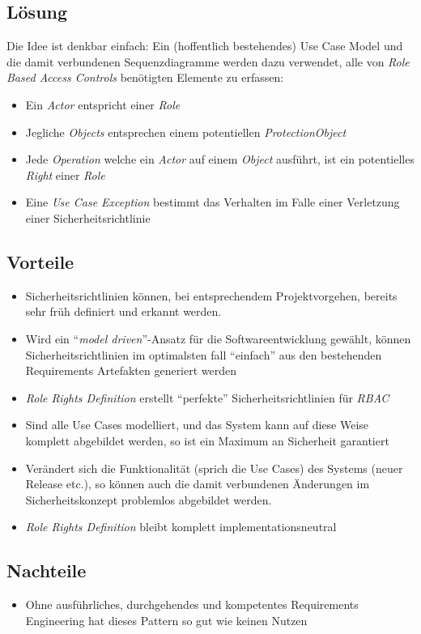 \subsection*{Lösung}
Die Idee ist denkbar einfach: Ein (hoffentlich bestehendes) Use Case Model und die damit verbundenen Sequenzdiagramme werden dazu verwendet, alle von \emph{Role Based Access Controls} benötigten Elemente zu erfassen:

\begin{itemize}
	\item Ein \emph{Actor} entspricht einer \emph{Role}
	\item Jegliche \emph{Objects} entsprechen einem potentiellen \emph{ProtectionObject}
	\item Jede \emph{Operation} welche ein \emph{Actor} auf einem \emph{Object} ausführt, ist ein potentielles \emph{Right} einer \emph{Role}
	\item Eine \emph{Use Case Exception} bestimmt das Verhalten im Falle einer Verletzung einer Sicherheitsrichtlinie
\end{itemize}


\subsection*{Vorteile}
\begin{itemize}
	\item Sicherheitsrichtlinien können, bei entsprechendem Projektvorgehen, bereits sehr früh definiert und erkannt werden.
	\item Wird ein ``\emph{model driven}''-Ansatz für die Softwareentwicklung gewählt, können Sicherheitsrichtlinien im optimalsten fall ``einfach'' aus den bestehenden Requirements Artefakten generiert werden
	\item \emph{Role Rights Definition} erstellt ``perfekte'' Sicherheitsrichtlinien für \emph{\gls{RBAC}}
	\item Sind alle Use Cases modelliert, und das System kann auf diese Weise komplett abgebildet werden, so ist ein Maximum an Sicherheit garantiert
	\item Verändert sich die Funktionalität (sprich die Use Cases) des Systems (neuer Release etc.), so können auch die damit verbundenen Änderungen im Sicherheitskonzept problemlos abgebildet werden.
	\item \emph{Role Rights Definition} bleibt komplett implementationsneutral
\end{itemize}

\subsection*{Nachteile}
\begin{itemize}
	\item Ohne ausführliches, durchgehendes und kompetentes Requirements Engineering hat dieses Pattern so gut wie keinen Nutzen
\end{itemize}

